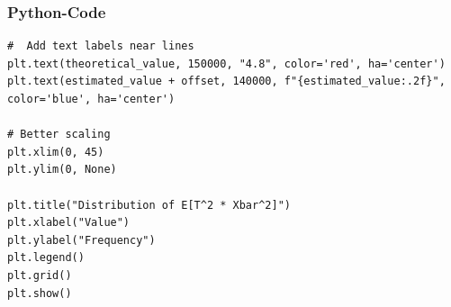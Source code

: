 \documentclass{beamer}
\begin{document}
\begin{frame}[fragile]
\frametitle{Python-Code}
\begin{lstlisting}
#  Add text labels near lines
plt.text(theoretical_value, 150000, "4.8", color='red', ha='center')
plt.text(estimated_value + offset, 140000, f"{estimated_value:.2f}", color='blue', ha='center')

# Better scaling
plt.xlim(0, 45)
plt.ylim(0, None)

plt.title("Distribution of E[T^2 * Xbar^2]")
plt.xlabel("Value")
plt.ylabel("Frequency")
plt.legend()
plt.grid()
plt.show()
\end{lstlisting}
\end{frame}
\end{document}
